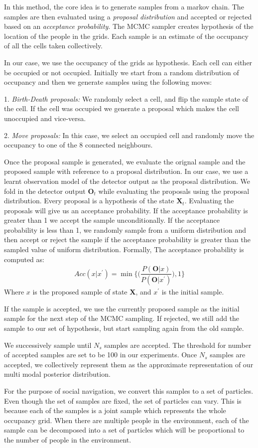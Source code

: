 In this method, the core idea is to generate samples from a markov chain. The samples are then evaluated using a \textit{proposal distribution} and accepted or rejected based on an \textit{acceptance probability}. The MCMC sampler creates hypothesis of the location of the people in the grids. Each sample is an estimate of the occupancy of all the cells taken collectively. 

In our case, we use the occupancy of the grids as hypothesis. Each cell can either be occupied or not occupied. Initially we start from a random distribution of occupancy and then we generate samples using the following moves:

1. \textit{Birth-Death proposals:}
We randomly select a cell, and flip the sample state of the cell. If the cell was occupied we generate a proposal which makes the cell unoccupied and vice-versa.

2. \textit{Move proposals:}
In this case, we select an occupied cell and randomly move the occupancy to one of the 8 connected neighbours.

Once the proposal sample is generated, we evaluate the orignal sample and the proposed sample with reference to a proposal distribution. In our case, we use a learnt observation model of the detector output as the proposal distribution. We fold in the detector output $\textbf{O}_{t}$ while evaluating the proposals using the proposal distribution. Every proposal is a hypothesis of the state $\textbf{X}_{t}$.
Evaluating the proposals will give us an acceptance probability. If the acceptance probability is greater than 1 we accept the sample unconditionally. If the acceptance probability is less than 1, we randomly sample from a uniform distribution and then accept or reject the sample if the acceptance probability is greater than the sampled value of uniform distribution. Formally,
The acceptance probability is computed as:
\begin{align}
Acc(x|x^{'}) = \min\Big\lbrace\Big(\dfrac{P(\textbf{O}|x)}{P(\textbf{O}|x^{'})}\Big),1\Big\rbrace
\end{align}
Where $x$ is the proposed sample of state \textbf{X}, and $x^{'}$ is the initial sample.

If the sample is accepted, we use the currently proposed sample as the initial sample for the next step of the MCMC sampling. If rejected, we still add the sample to our set of hypothesis, but start sampling again from the old sample.

We successively sample until $N_{s}$ samples are accepted. The threshold for number of accepted samples are set to be 100 in our experiments. Once $N_{s}$ samples are accepted, we collectively represent them as the approximate representation of our multi modal posterior distribution. 

For the purpose of social navigation, we convert this samples to a set of particles. Even though the set of samples are fixed, the set of particles can vary. This is because each of the samples is a joint sample which represents the whole occupancy grid. When there are multiple people in the environment, each of the sample can be decomposed into a set of particles which will be proportional to the number of people in the environment. %